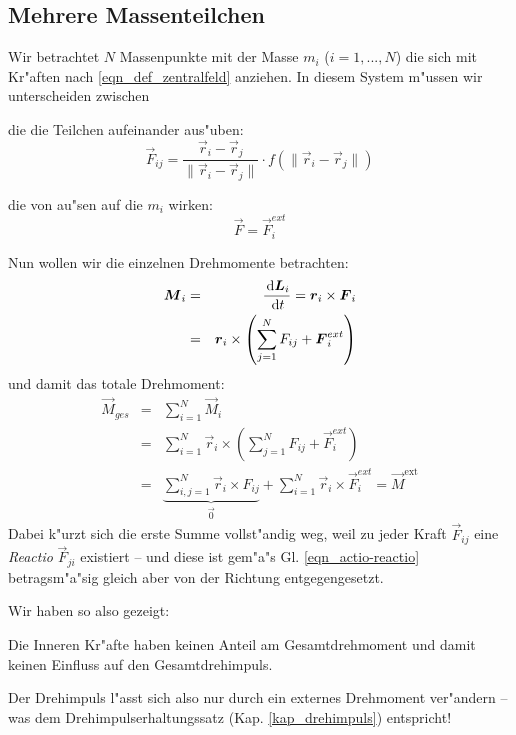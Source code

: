 \subsection{Mehrere Massenteilchen}
\label{kap_mehrere-massenteilchen}

Wir betrachtet $N$ Massenpunkte mit der Masse $m_i$ ($i = 1,...,N$)
die sich mit Kr"aften nach \eqref{eqn_def_zentralfeld} anziehen. In diesem
System
m"ussen wir unterscheiden zwischen 
\begin{description}[\setlabelstyle{\bfseries\slshape}]
\item[Innere Kr"afte] die die Teilchen aufeinander aus"uben:
   \begin{equation}
      \label{eq:34}
      \vec F_{ij} = \frac{\vec r_i - \vec r_j}{\|\vec r_i - \vec r_j\|}
      \cdot  f(\|\vec r_i - \vec r_j\|) 
   \end{equation}
\item["Au"sere Kr"afte] die von au"sen auf die $m_i$ wirken:
   \begin{equation}
      \label{eq:35}
      \vec F = \vec F_i^{ext}
   \end{equation}
\end{description}
Nun wollen wir die einzelnen Drehmomente betrachten:
\begin{eqnarray*}
   \label{eq:37}
\nonumber
   \boldsymbol{M}_i &=& \frac{\, \mathrm{d} \boldsymbol{L}_i}{\, \mathrm{d} t} = \boldsymbol{r}_i \times \boldsymbol{F}_i \\
&=&  \boldsymbol{r}_i \times \left ( \sum_{j = 1}^N F_{ij} + \boldsymbol{F}_i^{ext}
   \right )
\end{eqnarray*}
und damit das totale Drehmoment:
\begin{eqnarray}
   \label{eq:38}
\nonumber
\vec M_{ges} &=& \sum_{i = 1}^N \vec M_i \\
\nonumber
&=& \sum_{i = 1}^N \vec r_i \times \left ( \sum_{j = 1}^N F_{ij} + \vec
F_i^{ext}
   \right )\\
&=& \underbrace{\sum_{i,j = 1}^N \vec r_i \times F_{ij}}_{\vec 0} + \sum_{i =
1}^N \vec r_i \times \vec F_i^{ext} = \vec M^\text{ext}
\end{eqnarray}
Dabei k"urzt sich die erste Summe vollst"andig weg, weil zu jeder Kraft
$\vec F_{ij}$ eine \emph{Reactio} $\vec F_{ji}$ existiert -- und diese
ist gem"a"s Gl. \eqref{eqn_actio-reactio} betragsm"a"sig gleich aber von
der Richtung entgegengesetzt.

Wir haben so also gezeigt:
\begin{Wichtig}
   Die Inneren Kr"afte haben keinen Anteil am Gesamtdrehmoment und
   damit keinen Einfluss auf den Gesamtdrehimpuls.
\end{Wichtig}
Der Drehimpuls l"asst sich also nur durch ein externes Drehmoment
ver"andern -- was dem Drehimpulserhaltungssatz
(Kap. \ref{kap_drehimpuls}) entspricht!





















